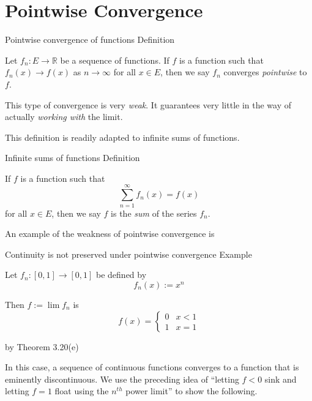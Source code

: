 \section{Pointwise Convergence}

\begin{result}
    {Pointwise convergence of functions}
    {Definition}

    Let $f_n: E \rightarrow \mathbb{R}$ be a sequence of functions. If $f$ is a function such that $f_n(x) \to f(x)$ as $n \to \infty$ for all $x \in E$, then we say $f_n$ converges \textit{pointwise} to $f$.
\end{result}

This type of convergence is very \textit{weak}. It guarantees very little in the way of actually \textit{working with} the limit.

This definition is readily adapted to infinite sums of functions.

\begin{result}
    {Infinite sums of functions}
    {Definition}
    
    If $f$ is a function such that 
    \[\sum_{n=1}^\infty f_n(x) = f(x)\] 
    for all $x \in E$, then we say $f$ is the \textit{sum} of the series $f_n$.
\end{result}

An example of the weakness of pointwise convergence is

\begin{result}
    {Continuity is not preserved under pointwise convergence}
    {Example} 

    Let $f_n: [0, 1] \rightarrow [0, 1]$ be defined by
    \[f_n(x) := x^n\]

    Then $f := \lim f_n$ is 
    \[f(x) = \begin{cases}
        0 & x < 1 \\
        1 & x = 1
    \end{cases}\]

    by Theorem 3.20(e)
\end{result}

In this case, a sequence of continuous functions converges to a function that is eminently discontinuous. We use the preceding idea of ``letting $f < 0$ sink and letting $f = 1$ float using the $n^{th}$ power limit'' to show the following.

